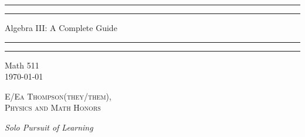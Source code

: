 \documentclass[12pt, a4paper, oneside, openright, titlepage]{book}
\begin{document}

\begin{titlepage}
    \centering
    \scshape
    \vspace*{\baselineskip}
    \rule{\textwidth}{1.6pt}\vspace*{-\baselineskip}\vspace*{2pt}
    \rule{\textwidth}{0.4pt}
    
    \vspace{0.75\baselineskip}
    
    {\LARGE Algebra III: A Complete Guide}
    
    \vspace{0.75\baselineskip}
    
    \rule{\textwidth}{0.4pt}\vspace*{-\baselineskip}\vspace{3.2pt}
    \rule{\textwidth}{1.6pt}
    
    \vspace{2\baselineskip}
    Math 511 \\
    \vspace*{3\baselineskip}
    \monthdayyeardate\today \\
    \vspace*{5.0\baselineskip}
    
    {\scshape\Large E/Ea Thompson(they/them), \\ Physics and Math Honors\\}
    
    \vspace{1.0\baselineskip}
    \textit{Solo Pursuit of Learning}
    \vfill
    \enlargethispage{1in}
    \begin{figure}[b!]
    \end{figure}
\end{titlepage}
\end{document}
